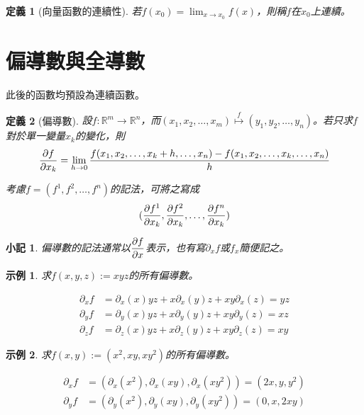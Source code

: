 \documentclass[12pt]{article}
\newtheorem{definition}{定義}
\newtheorem*{remark}{小記}
\newtheorem*{example}{示例}
\begin{document}
    \begin{definition}[向量函數的連續性]
        若$f(x_0)=\displaystyle \lim_{x\to x_0}f(x)$，則稱$f$在$x_0$上連續。
    \end{definition}

    \section*{偏導數與全導數}

    此後的函數均預設為連續函數。

    \begin{definition}[偏導數]
        設$f:\mathbb{R}^m\to\mathbb{R}^n$，而$(x_1,x_2,\dots,x_m)\overset{f}{\mapsto}(y_1,y_2,\dots,y_n)$。若只求$f$對於單一變量$x_k$的變化，則$$\partialderivative{f}{x_k}=\lim_{h\to 0}\frac{f(x_1,x_2,\dots,x_k+h,\dots,x_n)-f(x_1,x_2,\dots,x_k,\dots,x_n)}{h}$$

        考慮$f=(f^1,f^2,\dots,f^n)$的記法，可將之寫成$$(\partialderivative{f^1}{x_k},\partialderivative{f^2}{x_k},\dots,\partialderivative{f^n}{x_k})$$
    \end{definition}

    \begin{remark}
        偏導數的記法通常以$\displaystyle\partialderivative{f}{x}$表示，也有寫$\partial_x f$或$f_x$簡便記之。
    \end{remark}

    \begin{example}
        求$f(x,y,z):=xyz$的所有偏導數。

        \begin{align*}
            \partial_x f&=\partial_x(x)yz+x\partial_x(y)z+xy\partial_x(z)=yz\\
            \partial_y f&=\partial_y(x)yz+x\partial_y(y)z+xy\partial_y(z)=xz\\
            \partial_z f&=\partial_z(x)yz+x\partial_z(y)z+xy\partial_z(z)=xy
        \end{align*}
    \end{example}

    \begin{example}
        求$f(x,y):=(x^2,xy,xy^2)$的所有偏導數。

        \begin{align*}
            \partial_x f&=(\partial_x(x^2),\partial_x(xy),\partial_x(xy^2))=(2x,y,y^2)\\
            \partial_y f&=(\partial_y(x^2),\partial_y(xy),\partial_y(xy^2))=(0,x,2xy)
        \end{align*}
    \end{example}
\end{document}

